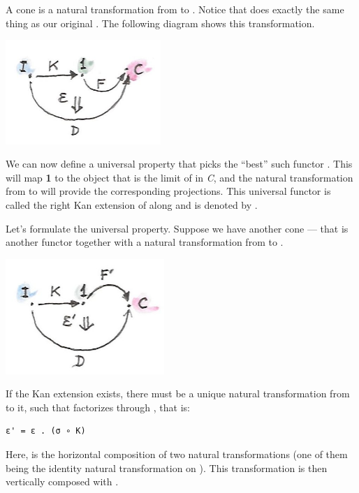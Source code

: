 A cone is a natural transformation  from  to
. Notice that  does exactly the same thing as
our original . The following diagram shows this
transformation.

\includegraphics[width=2.31250in]{images/kan3-e1492120491591.jpg}

We can now define a universal property that picks the ``best'' such
functor . This  will map \textbf{1} to the object
that is the limit of  in \emph{C}, and the natural
transformation  from  to  will
provide the corresponding projections. This universal functor is called
the right Kan extension of  along  and is denoted by
.

Let's formulate the universal property. Suppose we have another cone ---
that is another functor  together with a natural
transformation  from  to
.

\includegraphics[width=2.36458in]{images/kan31-e1492120512209.jpg}

If the Kan extension  exists, there must be a unique
natural transformation  from  to it, such
that  factorizes through , that is:

\begin{verbatim}
ε' = ε . (σ ∘ K)
\end{verbatim}

Here,  is the horizontal composition of two natural
transformations (one of them being the identity natural transformation
on ). This transformation is then vertically composed with
.

